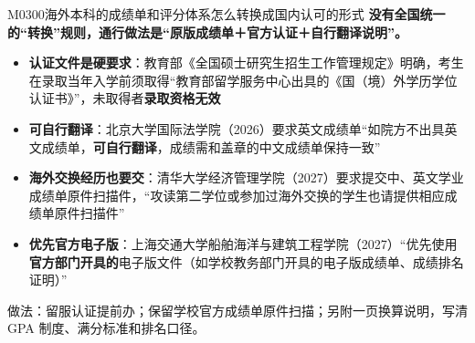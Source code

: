 \begin{qa}{M0300}{海外本科的成绩单和评分体系怎么转换成国内认可的形式}
\textbf{没有全国统一的“转换”规则，通行做法是“原版成绩单＋官方认证＋自行翻译说明”。}

\begin{itemize}
  \item \textbf{认证文件是硬要求}：教育部《全国硕士研究生招生工作管理规定》明确，考生在录取当年入学前须取得“教育部留学服务中心出具的《国（境）外学历学位认证书》”，未取得者\textbf{录取资格无效}
  \item \textbf{可自行翻译}：北京大学国际法学院（2026）要求英文成绩单“如院方不出具英文成绩单，\textbf{可自行翻译}，成绩需和盖章的中文成绩单保持一致”
  \item \textbf{海外交换经历也要交}：清华大学经济管理学院（2027）要求提交中、英文学业成绩单原件扫描件，“攻读第二学位或参加过海外交换的学生也请提供相应成绩单原件扫描件”
  \item \textbf{优先官方电子版}：上海交通大学船舶海洋与建筑工程学院（2027）“优先使用\textbf{官方部门开具的}电子版文件（如学校教务部门开具的电子版成绩单、成绩排名证明）”
\end{itemize}

做法：留服认证提前办；保留学校官方成绩单原件扫描；另附一页换算说明，写清 GPA 制度、满分标准和排名口径。
\end{qa}

